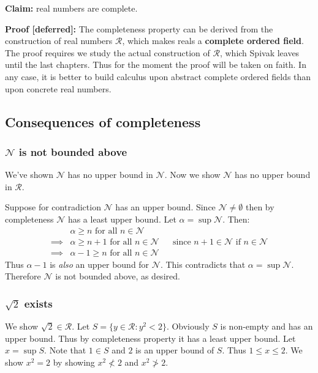 \vs

\textbf{Claim:} real numbers are complete.

\textbf{Proof [deferred]:} The completeness property can be derived
from the construction of real numbers $\mathcal{R}$, which makes reals a
\textbf{complete ordered field}. The proof requires we study the
actual construction of $\mathcal{R}$, which Spivak leaves until the last
chapters. Thus for the moment the proof will be taken on faith. In any
case, it is better to build calculus upon abstract complete ordered
fields than upon concrete real numbers.

\subsection{Consequences of completeness}

\subsubsection*{$\mathcal{N}$ is not bounded above}
We've shown $\mathcal{N}$ has no upper bound in $\mathcal{N}$. Now we
show $\mathcal{N}$ has no upper bound in $\mathcal{R}$.

\vs

Suppose for contradiction $\mathcal{N}$ has an upper bound. Since $\mathcal{N}\neq\emptyset$ then by
completeness $\mathcal{N}$ has a least upper bound. Let $\alpha=\sup \mathcal{N}$. Then:
\begin{align*}
  &\alpha\geq n \text{ for all } n\in\mathcal{N}\\
  \implies &\alpha\geq n+1 \text{ for all } n\in\mathcal{N}&&\text{since $n+1\in\mathcal{N}$ if $n\in\mathcal{N}$}\\
  \implies &\alpha-1\geq n \text{ for all } n\in\mathcal{N}
\end{align*}
Thus $\alpha-1$ is \textit{also} an upper bound for $\mathcal{N}$. This contradicts
that $\alpha=\sup \mathcal{N}$. Therefore $\mathcal{N}$ is not bounded above, as desired.

\vs

\subsubsection*{$\sqrt{2}$ exists}

We show $\sqrt{2}\in\mathcal{R}$. Let
$S=\{y\in\mathcal{R} : y^{2}<2\}$. Obviously $S$ is non-empty and has an upper
bound. Thus by completeness property it has a least upper bound. Let
$x=\sup S$. Note that $1\in S$ and $2$ is an upper bound of $S$. Thus
$1\leq x\leq2$. We show $x^{2}=2$ by showing $x^{2}\not<2$ and
$x^{2}\not>2$.

